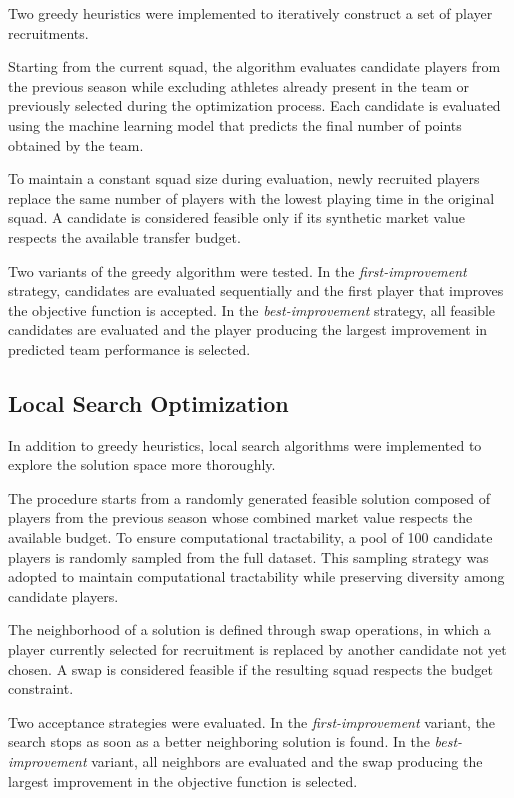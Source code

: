 \documentclass[a4paper,fleqn]{cas-sc}
\begin{document}
Two greedy heuristics were implemented to iteratively construct a set of player recruitments.

Starting from the current squad, the algorithm evaluates candidate players from the previous season while excluding athletes already present in the team or
previously selected during the optimization process. Each candidate is evaluated using the machine learning model that predicts the final number of points
obtained by the team.

To maintain a constant squad size during evaluation, newly recruited players replace the same number of players with the lowest playing time in the original
squad. A candidate is considered feasible only if its synthetic market value respects the available transfer budget.

Two variants of the greedy algorithm were tested. In the \textit{first-improvement} strategy, candidates are evaluated sequentially and the first player that improves
the objective function is accepted. In the \textit{best-improvement} strategy, all feasible candidates are evaluated and the player producing the largest
improvement in predicted team performance is selected.

\subsection{Local Search Optimization}

In addition to greedy heuristics, local search algorithms were implemented to explore the solution space more thoroughly.

The procedure starts from a randomly generated feasible solution composed of players from the previous season whose combined market value respects the
available budget. To ensure computational tractability, a pool of 100 candidate players is randomly sampled from the full dataset.
This sampling strategy was adopted to maintain computational tractability while preserving diversity among candidate players.

The neighborhood of a solution is defined through swap operations, in which a player currently selected for recruitment is replaced by another candidate not
yet chosen. A swap is considered feasible if the resulting squad respects the budget constraint.

Two acceptance strategies were evaluated. In the \textit{first-improvement} variant, the search stops as soon as a better neighboring solution is found.
In the \textit{best-improvement} variant, all neighbors are evaluated and the swap producing the largest improvement in the objective function is selected.
\end{document}
